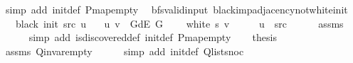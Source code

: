 \begin{isabellebody}
\ {\isacharparenleft}{\kern0pt}simp\ add{\isacharcolon}{\kern0pt}\ init{\isacharunderscore}{\kern0pt}def\ P{\isachardot}{\kern0pt}map{\isacharunderscore}{\kern0pt}empty{\isacharparenright}{\kern0pt}%
\endisatagproof
{\isafoldproof}%
%
\isadelimproof
\isanewline
%
\endisadelimproof
\isanewline
{}\isamarkupfalse%
\ {\isacharparenleft}{\kern0pt}\ bfs{\isacharunderscore}{\kern0pt}valid{\isacharunderscore}{\kern0pt}input{\isacharparenright}{\kern0pt}\ black{\isacharunderscore}{\kern0pt}imp{\isacharunderscore}{\kern0pt}adjacency{\isacharunderscore}{\kern0pt}not{\isacharunderscore}{\kern0pt}white{\isacharunderscore}{\kern0pt}init{\isacharcolon}{\kern0pt}\isanewline
\ \ \ {\isachardoublequoteopen}black\ {\isacharparenleft}{\kern0pt}init\ src{\isacharparenright}{\kern0pt}\ u{\isachardoublequoteclose}\isanewline
\ \ \ {\isachardoublequoteopen}{\isacharparenleft}{\kern0pt}u{\isacharcomma}{\kern0pt}\ v{\isacharparenright}{\kern0pt}\ {\isasymin}\ G{\isachardot}{\kern0pt}dE\ G{\isachardoublequoteclose}\isanewline
\ \ \ {\isachardoublequoteopen}{\isasymnot}\ white\ s\ v{\isachardoublequoteclose}\isanewline
%
\isadelimproof
%
\endisadelimproof
%
\isatagproof
{}\isamarkupfalse%
\ {\isacharminus}{\kern0pt}\isanewline
\ \ \isamarkupfalse%
\ {\isachardoublequoteopen}u\ {\isacharequal}{\kern0pt}\ src{\isachardoublequoteclose}\isanewline
\ \ \ \ \isamarkupfalse%
\ assms{\isacharparenleft}{\kern0pt}{}{\isacharparenright}{\kern0pt}\isanewline
\ \ \ \ \isamarkupfalse%
\ {\isacharparenleft}{\kern0pt}simp\ add{\isacharcolon}{\kern0pt}\ is{\isacharunderscore}{\kern0pt}discovered{\isacharunderscore}{\kern0pt}def\ init{\isacharunderscore}{\kern0pt}def\ P{\isachardot}{\kern0pt}map{\isacharunderscore}{\kern0pt}empty{\isacharparenright}{\kern0pt}\isanewline
\ \ \isamarkupfalse%
\ {\isacharquery}{\kern0pt}thesis\isanewline
\ \ \ \ \isamarkupfalse%
\ assms{\isacharparenleft}{\kern0pt}{}{\isacharparenright}{\kern0pt}\ Q{\isachardot}{\kern0pt}invar{\isacharunderscore}{\kern0pt}empty\isanewline
\ \ \ \ \isamarkupfalse%
\ {\isacharparenleft}{\kern0pt}simp\ add{\isacharcolon}{\kern0pt}\ init{\isacharunderscore}{\kern0pt}def\ Q{\isachardot}{\kern0pt}list{\isacharunderscore}{\kern0pt}snoc{\isacharparenright}{\kern0pt}\isanewline
{}\isamarkupfalse%
%
\endisatagproof
{\isafoldproof}%
%
\isadelimproof
\isanewline
%
\endisadelimproof
\isanewline
{}\isamarkupfalse%

\end{isabellebody}
